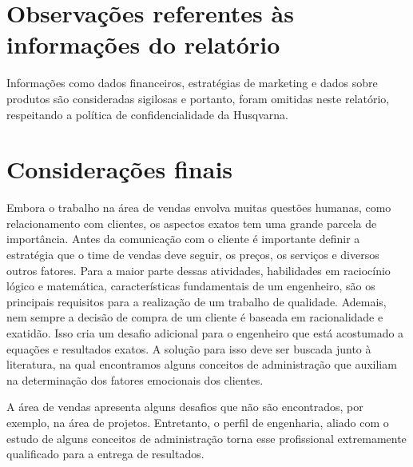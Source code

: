 \documentclass[12pt]{article}
\begin{document}
\pagebreak

\section{Observações referentes às informações do relatório
}
	Informações como dados financeiros, estratégias de marketing e dados sobre produtos são consideradas sigilosas e portanto, foram omitidas neste relatório, respeitando a política de confidencialidade da Husqvarna.
\pagebreak

\section{Considerações finais}
	
	Embora o trabalho na área de vendas envolva muitas questões humanas, como relacionamento com clientes, os aspectos exatos tem uma grande parcela de importância. Antes da comunicação com o cliente é importante definir a estratégia que o time de vendas deve seguir, os preços, os serviços e diversos outros fatores. Para a maior parte dessas atividades, habilidades em raciocínio lógico e matemática, características fundamentais de um engenheiro, são os principais requisitos para a realização de um trabalho de qualidade. Ademais, nem sempre a decisão de compra de um cliente é baseada em racionalidade e exatidão. Isso cria um desafio adicional para o engenheiro que está acostumado a equações e resultados exatos. A solução para isso deve ser buscada junto à literatura, na qual encontramos alguns conceitos de administração que auxiliam na determinação dos fatores emocionais dos clientes.
	
	A área de vendas apresenta alguns desafios que não são encontrados, por exemplo, na área de projetos. Entretanto, o perfil de engenharia, aliado com o estudo de alguns conceitos de administração torna esse profissional extremamente qualificado para a entrega de resultados.

\pagebreak
\end{document}
